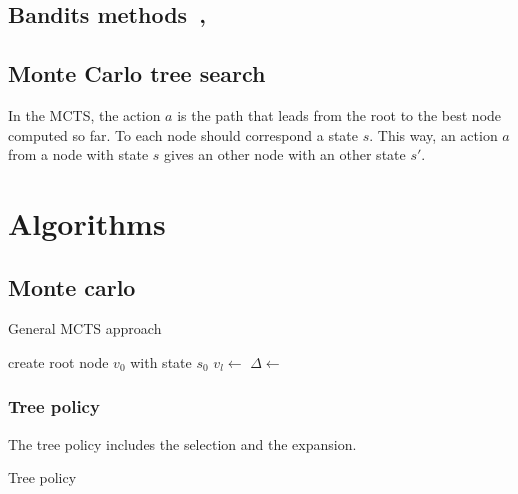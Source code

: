 \documentclass{article}
\begin{document}
\subsection{Bandits methods~\cite{browne2012survey},~\cite{kocsis2006bandit}}

\subsection{Monte Carlo tree search}
In the MCTS, the action \(a\) is the path that leads from the root to the best
node computed so far. To each node should correspond a state \(s\). This way, an
action \(a\) from a node with state \(s\) gives an other node with an other
state \(s'\).

\section{Algorithms}
\subsection{Monte carlo}
\begin{algorithm}
  \caption{General MCTS approach~\cite{browne2012survey}}
  \begin{algorithmic}
    \State{}create root node \(v_0\) with state \(s_0\)
    \State{} \(v_l \gets\) 
    \State{} \(\Delta \gets\) 
    \State{} 
    \EndWhile{}
    \EndFunction{}
  \end{algorithmic}
\end{algorithm}

\subsubsection{Tree policy}
The tree policy includes the selection and the expansion.
\begin{algorithm}
  \caption{Tree policy}
  \begin{algorithmic}
    \EndIf{}
    \EndWhile{}
    \EndFunction{}
  \end{algorithmic}
\end{algorithm}
\end{document}
